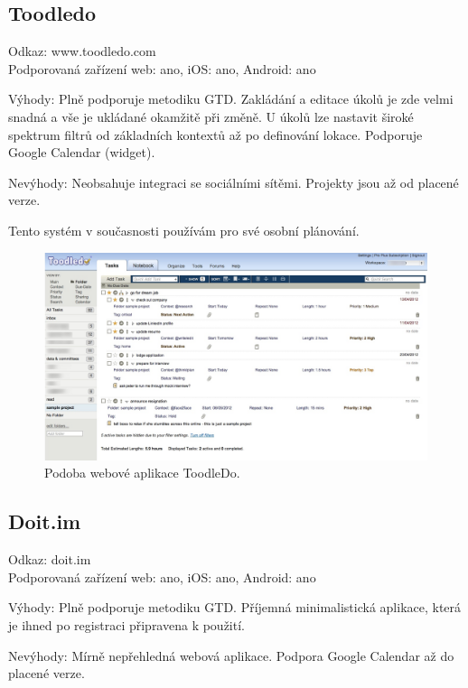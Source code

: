 \documentclass[thesis=B,czech]{FITthesis}[2012/06/26]
\begin{document}
\subsection{Toodledo}

Odkaz: www.toodledo.com\\
Podporovaná zařízení web: ano, iOS: ano, Android: ano

Výhody:
Plně podporuje metodiku GTD. Zakládání a editace úkolů je zde velmi snadná a vše je ukládané okamžitě při změně. U úkolů lze nastavit široké spektrum filtrů od základních kontextů až po definování lokace.
Podporuje Google Calendar (widget).

Nevýhody:
Neobsahuje integraci se sociálními sítěmi.  
Projekty jsou až od placené verze.

Tento systém v současnosti používám pro své osobní plánování.

\begin{figure}\centering
	\includegraphics[width=1\textwidth]{pictures/toodledo_overview}
	\caption{Podoba webové aplikace ToodleDo.\cite{toodledo_overview}}\label{fig:toodlefo_overview}
\end{figure}

\newpage

\subsection{Doit.im}

Odkaz: doit.im\\
Podporovaná zařízení web: ano, iOS: ano, Android: ano

Výhody:
Plně podporuje metodiku GTD. Příjemná minimalistická aplikace, která je ihned po registraci připravena k použití.  

Nevýhody:
Mírně nepřehledná webová aplikace.
Podpora Google Calendar až do placené verze.
\end{document}
